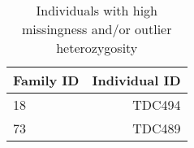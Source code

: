 \begin{table}[h]
\centering
\caption{Individuals with high missingness and/or outlier heterozygosity} 
\begin{tabular}{lr}
  \hline
Family ID & Individual ID \\ 
  \hline
 18 & TDC494 \\ 
   73 & TDC489 \\ 
   \hline
\end{tabular}
\end{table}
